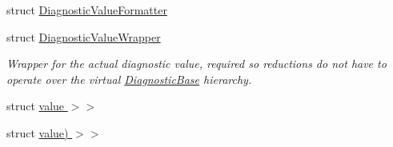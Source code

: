 \begin{DoxyCompactItemize}
struct \hyperlink{structvt_1_1runtime_1_1component_1_1detail_1_1_diagnostic_value_formatter}{Diagnostic\+Value\+Formatter}
\item 
struct \hyperlink{structvt_1_1runtime_1_1component_1_1detail_1_1_diagnostic_value_wrapper}{Diagnostic\+Value\+Wrapper}
\begin{DoxyCompactList}\small\item\em Wrapper for the actual diagnostic value, required so reductions do not have to operate over the virtual {\ttfamily \hyperlink{structvt_1_1runtime_1_1component_1_1detail_1_1_diagnostic_base}{Diagnostic\+Base}} hierarchy. \end{DoxyCompactList}\item 
struct \hyperlink{structvt_1_1runtime_1_1component_1_1detail_1_1_diagnostic_value_formatter_3_01_t_00_01typename_0c9abbc05a2cb3e61ce5908f9ea9ba841}{value $>$$>$}
\item 
struct \hyperlink{structvt_1_1runtime_1_1component_1_1detail_1_1_diagnostic_value_formatter_3_01_t_00_01typename_0591af1544272b2addbb347536de876db}{value) $>$$>$}
\end{DoxyCompactItemize}
